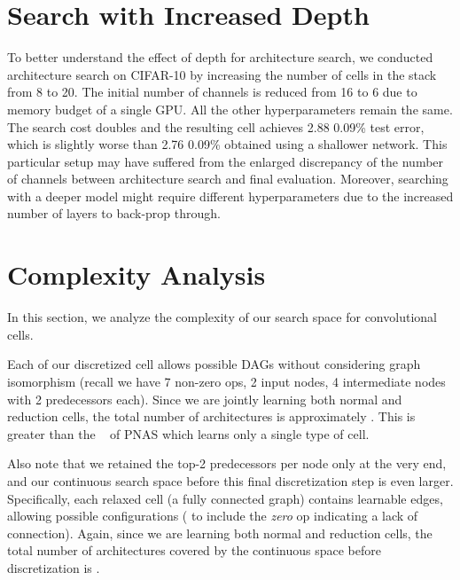 \documentclass{article}
\begin{document}
\section{Search with Increased Depth}
To better understand the effect of depth for architecture search,
we conducted architecture search on CIFAR-10 by increasing the number of cells in the stack from 8 to 20.
The initial number of channels is reduced from 16 to 6 due to memory budget of a single GPU. All the other hyperparameters remain the same. The search cost doubles and the resulting cell achieves 2.88  0.09\% test error, which is slightly worse than 2.76  0.09\% obtained using a shallower network.
This particular setup may have suffered from the enlarged discrepancy of the number of channels between architecture search and final evaluation.
Moreover, searching with a deeper model might require different hyperparameters due to the increased number of layers to back-prop through. 


\section{Complexity Analysis}
In this section,
we analyze the complexity of our search space for convolutional cells.

Each of our discretized cell allows  possible DAGs without considering graph isomorphism (recall we have 7 non-zero ops, 2 input nodes, 4 intermediate nodes with 2 predecessors each). Since we are jointly learning both normal and reduction cells, the total number of architectures is approximately . This is greater than the ~ of PNAS \citep{liu2017progressive} which learns only a single type of cell.

Also note that we retained the top-2 predecessors per node only at the very end, and our continuous search space before this final discretization step is even larger. Specifically, each relaxed cell (a fully connected graph) contains  learnable edges, allowing  possible configurations ( to include the \emph{zero} op indicating a lack of connection). Again, since we are learning both normal and reduction cells, the total number of architectures covered by the continuous space before discretization is .
\end{document}

